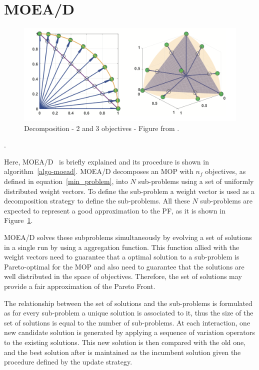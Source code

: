 
\section{MOEA/D}

\begin{figure}[!t]
	\centering
	\includegraphics[width=\textwidth]{images/decomp2.png}
	\caption{Decomposition  -  2 and 3 objectives - Figure from \cite{chugh2017handling}.}
	\label{decomp2-example}
\end{figure}.

Here, MOEA/D~\cite{zhang2007moea} is briefly explained and its procedure is shown in algorithm~\ref{algo-moead}. MOEA/D decomposes an MOP with $n_f$ objectives, as defined in equation~\ref{min_problem}, into $N$  sub-problems using a set of uniformly distributed weight vectors. To define the sub-problem a weight vector is used as a decomposition strategy to  define the sub-problems.  All these $N$ sub-problems are expected to represent a good approximation to the PF, as it is shown in Figure~\ref{decomp2-example}.

MOEA/D solves these subproblems simultaneously by evolving a set of solutions in a single run by using a aggregation function. This function allied with the weight vectors need to guarantee that a optimal solution to a sub-problem is Pareto-optimal for the MOP and also need to guarantee that the solutions are well distributed in the space of objectives. Therefore, the set of solutions may provide a fair approximation of the Pareto Front.

The relationship between the set of solutions and the sub-problems is formulated as for every sub-problem a unique solution is associated to it, thus the size of the set of solutions is equal to the number of sub-problems.  At each interaction, one new candidate solution is generated by applying a sequence of variation operators to the existing solutions. This new solution is then compared with the old one, and the best solution after is maintained as the incumbent solution given the procedure defined by the update strategy.

